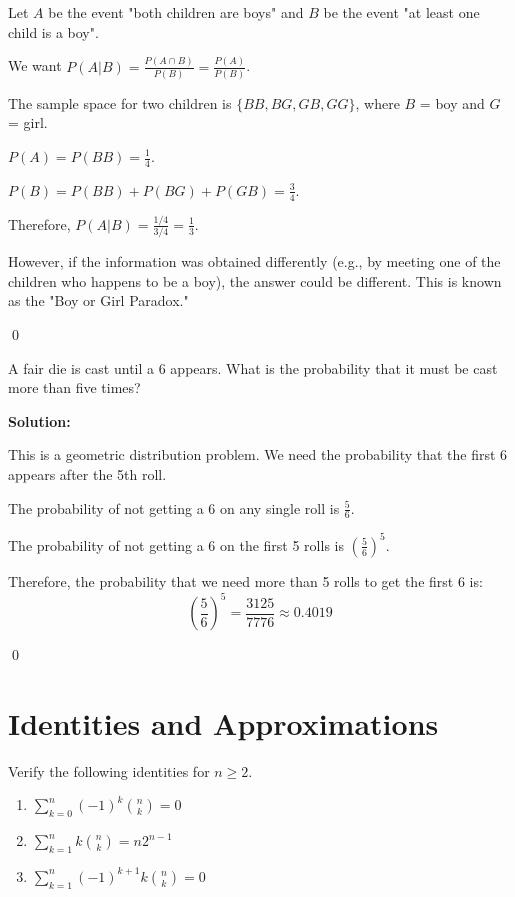Let $A$ be the event "both children are boys" and $B$ be the event "at least one child is a boy".

We want $P(A|B) = \frac{P(A \cap B)}{P(B)} = \frac{P(A)}{P(B)}$.

The sample space for two children is $\{BB, BG, GB, GG\}$, where $B$ = boy and $G$ = girl.

$P(A) = P(BB) = \frac{1}{4}$.

$P(B) = P(BB) + P(BG) + P(GB) = \frac{3}{4}$.

Therefore, $P(A|B) = \frac{1/4}{3/4} = \frac{1}{3}$.

However, if the information was obtained differently (e.g., by meeting one of the children who happens to be a boy), the answer could be different. This is known as the "Boy or Girl Paradox."



\qed
\begin{problembox}
A fair die is cast until a 6 appears. What is the probability that it must be cast more than five times?
\end{problembox}

\noindent\textbf{Solution:}

This is a geometric distribution problem. We need the probability that the first 6 appears after the 5th roll.

The probability of not getting a 6 on any single roll is $\frac{5}{6}$.

The probability of not getting a 6 on the first 5 rolls is $\left(\frac{5}{6}\right)^5$.

Therefore, the probability that we need more than 5 rolls to get the first 6 is:
\[ \left(\frac{5}{6}\right)^5 = \frac{3125}{7776} \approx 0.4019 \]



\qed
\section{Identities and Approximations}

\begin{problembox}
Verify the following identities for $n\geq 2$.
\begin{enumerate}[label=(\alph*)]
    \item $\sum_{k=0}^{n}(-1)^{k}\binom{n}{k}=0$
    \item $\sum_{k=1}^{n}k\binom{n}{k}=n2^{n-1}$
    \item $\sum_{k=1}^{n}(-1)^{k+1}k\binom{n}{k}=0$
\end{enumerate}
\end{problembox}

